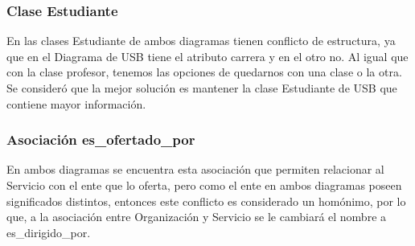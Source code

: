\message{ !name(InformeFase2.tex)}\documentclass[12pt,a4paper,spanish]{article}
\begin{document}
\subsubsection{Clase Estudiante}
\indent En las clases Estudiante de ambos diagramas tienen conflicto de estructura, ya que en el Diagrama de USB tiene el atributo carrera y en el otro no. Al igual que con la clase profesor, tenemos las opciones de quedarnos con una clase o la otra. Se consider\'o que la mejor soluci\'on es mantener la clase Estudiante de USB que contiene mayor informaci\'on.
\newline
\newline
\subsubsection{Asociaci\'on es_ofertado_por}
\newline
\indent En ambos diagramas se encuentra esta asociaci\'on que permiten relacionar al Servicio con el ente que lo oferta, pero como el ente en ambos diagramas poseen significados distintos, entonces este conflicto es considerado un hom\'onimo, por lo que, a la asociaci\'on entre Organizaci\'on y Servicio se le cambiar\'a el nombre a es_dirigido_por.
\end{document}
